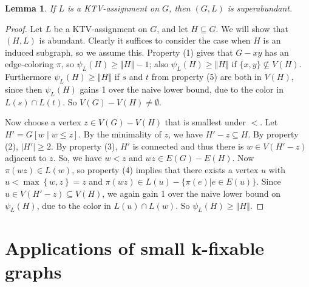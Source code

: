 \documentclass[12pt]{article}
\theoremstyle{plain}
\newtheorem{lem}[thm]{Lemma}
\theoremstyle{definition}
\theoremstyle{remark}
\newcommand{\set}[1]{\left\{ #1 \right\}}
\newcommand{\card}[1]{\left|#1\right|}
\newcommand{\size}[1]{\left\Vert#1\right\Vert}
\newcommand{\brackets}[1]{\left[ #1 \right]}
\begin{document}
\begin{lem}\label{KTVImpliesSuperabundant}
If $L$ is a KTV-assignment on $G$, then $(G, L)$ is superabundant.
\end{lem}
\begin{proof}
Let $L$ be a KTV-assignment on $G$, and let $H \subseteq G$.  We will show that
$(H,L)$ is abundant.  
Clearly it suffices to consider the case when $H$ is an induced subgraph, so we
assume this.
Property (1) gives that $G-xy$ has an edge-coloring
$\pi$, so $\psi_L(H)\ge \size{H}-1$; also $\psi_L(H)\ge \size{H}$ if
$\{x,y\}\not\subseteq V(H)$.  Furthermore $\psi_L(H)\ge \size{H}$ if $s$ and
$t$ from property (5) are both in $V(H)$, since then $\psi_L(H)$ gains 1 over
the naive lower bound, due to the color in $L(s)\cap L(t)$.  So $V(G)-
V(H)\ne \emptyset$.

Now choose a vertex $z \in V(G) - V(H)$ that is smallest under $<$.  
Let $H' = G\brackets{w \mid w \le z}$.  By the minimality of $z$, we have $H' -
z \subseteq H$. By property (2), $\card{H'} \ge 2$.  By property (3), $H'$ is
connected and thus there is $w \in V(H' - z)$ adjacent to $z$. So, we have $w <
z$ and $wz\in E(G)-E(H)$.  Now $\pi(wz)\in L(w)$,  
so property (4) implies that there exists a vertex $u$ with $u <
\max\set{w, z} = z$ and $\pi(wz) \in L(u)-\{\pi(e)|e\in E(u)\}$.  Since $u \in
V(H' - z) \subseteq V(H)$, we again gain 1 over the naive lower bound on
$\psi_L(H)$, due to the color in $L(u)\cap L(w)$.  So $\psi_L(H)\ge \size{H}$.
\end{proof}

\section{Applications of small k-fixable graphs}
\end{document}
